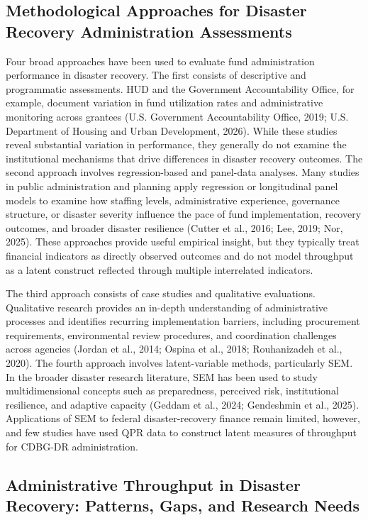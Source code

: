 \documentclass[
  number]{elsarticle}
\begin{document}
\subsection{Methodological Approaches for Disaster Recovery
Administration
Assessments}\label{methodological-approaches-for-disaster-recovery-administration-assessments}

Four broad approaches have been used to evaluate fund administration
performance in disaster recovery. The first consists of descriptive and
programmatic assessments. HUD and the Government Accountability Office,
for example, document variation in fund utilization rates and
administrative monitoring across grantees (U.S. Government
Accountability Office, 2019; U.S. Department of Housing and Urban
Development, 2026). While these studies reveal substantial variation in
performance, they generally do not examine the institutional mechanisms
that drive differences in disaster recovery outcomes. The second
approach involves regression-based and panel-data analyses. Many studies
in public administration and planning apply regression or longitudinal
panel models to examine how staffing levels, administrative experience,
governance structure, or disaster severity influence the pace of fund
implementation, recovery outcomes, and broader disaster resilience
(Cutter et al., 2016; Lee, 2019; Nor, 2025). These approaches provide
useful empirical insight, but they typically treat financial indicators
as directly observed outcomes and do not model throughput as a latent
construct reflected through multiple interrelated indicators.

The third approach consists of case studies and qualitative evaluations.
Qualitative research provides an in-depth understanding of
administrative processes and identifies recurring implementation
barriers, including procurement requirements, environmental review
procedures, and coordination challenges across agencies (Jordan et al.,
2014; Ospina et al., 2018; Rouhanizadeh et al., 2020). The fourth
approach involves latent-variable methods, particularly SEM. In the
broader disaster research literature, SEM has been used to study
multidimensional concepts such as preparedness, perceived risk,
institutional resilience, and adaptive capacity (Geddam et al., 2024;
Gendeshmin et al., 2025). Applications of SEM to federal
disaster-recovery finance remain limited, however, and few studies have
used QPR data to construct latent measures of throughput for CDBG-DR
administration.

\subsection{Administrative Throughput in Disaster Recovery: Patterns,
Gaps, and Research
Needs}\label{administrative-throughput-in-disaster-recovery-patterns-gaps-and-research-needs}
\end{document}
